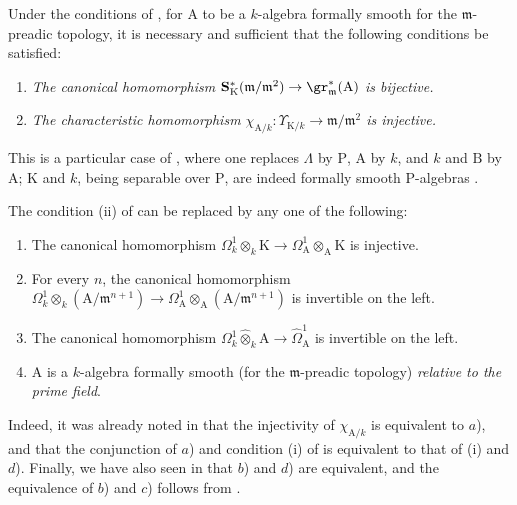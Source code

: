 \begin{theorem}[22.2.2]
\label{0.22.2.2}
Under the conditions of , for $\mathrm{A}$ to be a $k$-algebra formally smooth for the $\mathfrak{m}$-preadic topology, it is necessary and sufficient that the following conditions be satisfied:
\begin{enumerate}
  \item[\rm{(i)}] \emph{The canonical homomorphism $\mathbf{S}^*_\mathrm{K}(\mathfrak{m}/\mathfrak{m}^2)\to\gr^*_\mathfrak{m}(\mathrm{A})$ is bijective.}
  \item[\rm{(ii)}] \emph{The characteristic homomorphism $\chi_{\mathrm{A}/k}:\Upsilon_{\mathrm{K}/k}\to\mathfrak{m}/\mathfrak{m}^2$ is injective.}
\end{enumerate}
This is a particular case of , where one replaces $\Lambda$ by $\mathrm{P}$, $\mathrm{A}$ by $k$, and $k$ and $\mathrm{B}$ by $\mathrm{A}$; $\mathrm{K}$ and $k$, being separable over $\mathrm{P}$, are indeed formally smooth $\mathrm{P}$-algebras .
\end{theorem}

\begin{remark}[22.2.3]
\label{0.22.2.3}
The condition (ii) of  can be replaced by any one of the following:
\begin{enumerate}
  \item[a)] The canonical homomorphism $\Omega^1_k\otimes_k\mathrm{K}\to\Omega^1_\mathrm{A}\otimes_\mathrm{A}\mathrm{K}$ is injective.
  \item[b)] For every $n$, the canonical homomorphism $\Omega^1_k\otimes_k(\mathrm{A}/\mathfrak{m}^{n+1})\to\Omega^1_\mathrm{A}\otimes_\mathrm{A}(\mathrm{A}/\mathfrak{m}^{n+1})$ is invertible on the left.
  \item[c)] The canonical homomorphism $\Omega^1_k\widehat{\otimes}_k\mathrm{A}\to\widehat{\Omega}^1_\mathrm{A}$ is invertible on the left.
  \item[d)] $\mathrm{A}$ is a $k$-algebra formally smooth (for the $\mathfrak{m}$-preadic topology) \emph{relative to the prime field}.
\end{enumerate}
Indeed, it was already noted in  that the injectivity of $\chi_{\mathrm{A}/k}$ is equivalent to $a$), and that the conjunction of $a$) and condition (i) of  is equivalent to that of (i) and $d$).
Finally, we have also seen in  that $b$) and $d$) are equivalent, and the equivalence of $b$) and $c$) follows from .
\end{remark}

